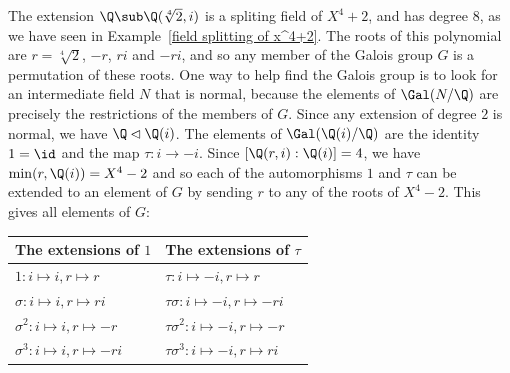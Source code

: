 \begin{example}
The extension $\Q\sub\Q(\sqrt[4]{2},i)$ is a spliting field of $X^4+2$, and has degree $8$, as we have seen in Example~\ref{field splitting of x^4+2}. The roots of this polynomial are $r=\sqrt[4]{2}$, $-r$, $ri$ and $-ri$, and so any member of the Galois group $G$ is a permutation of these roots. One way to help find the Galois group is to look for an intermediate field $N$ that is normal, because the elements of $\Gal(N/\Q)$ are precisely the restrictions of the members of $G$. Since any extension of degree $2$ is normal, we have $\Q\lhd\Q(i)$. The elements of $\Gal(\Q(i)/\Q)$ are the identity $1=\id$ and the map $\tau:i\to-i$. Since $[\Q(r,i):\Q(i)]=4$, we have $\min(r,\Q(i))=X^4-2$ and so each of the automorphisms $1$ and $\tau$ can be extended to an element of $G$ by sending $r$ to any of the roots of $X^4-2$. This gives all elements of $G$:
\begin{table}[htbp]
\centering
\begin{tabular}{l|l}
\hline
The extensions of $1$&The extensions of $\tau$\\
\hline
$1:i\mapsto i,r\mapsto r$&$\tau:i\mapsto-i,r\mapsto r$\\
$\sigma:i\mapsto i,r\mapsto ri$&$\tau\sigma:i\mapsto-i,r\mapsto -ri$\\
$\sigma^2:i\mapsto i,r\mapsto-r$&$\tau\sigma^2:i\mapsto-i,r\mapsto-r$\\
$\sigma^3:i\mapsto i,r\mapsto-ri$&$\tau\sigma^3:i\mapsto-i,r\mapsto ri$\\
\hline
\end{tabular}
\end{table}


\end{example}

